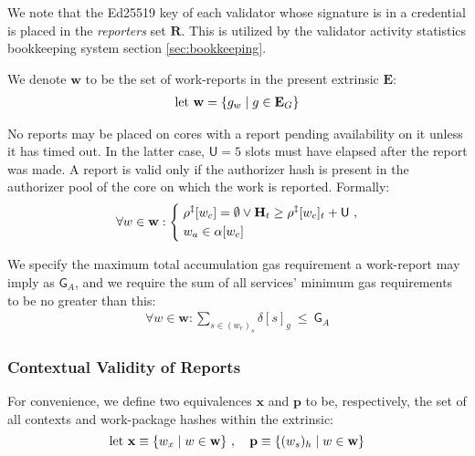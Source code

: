 We note that the Ed25519 key of each validator whose signature is in a credential is placed in the \emph{reporters} set $\mathbf{R}$. This is utilized by the validator activity statistics bookkeeping system section \ref{sec:bookkeeping}.

We denote $\mathbf{w}$ to be the set of work-reports in the present extrinsic $\mathbf{E}$:
\begin{align}
  \text{let}\ \mathbf{w} = \{ g_w \mid g \in \mathbf{E}_G \}
\end{align}

No reports may be placed on cores with a report pending availability on it unless it has timed out. In the latter case, $\mathsf{U} = 5$ slots must have elapsed after the report was made. A report is valid only if the authorizer hash is present in the authorizer pool of the core on which the work is reported. Formally:
\begin{equation}\label{eq:reportcoresareunusedortimedout}
  \forall w \in \mathbf{w} :\left\{\;\begin{aligned}
    &\rho^\ddagger[w_c] = \none \vee \mathbf{H}_t \ge \rho^\ddagger[w_c]_t + \mathsf{U}\ , \\
    &w_a \in \alpha[w_c]
  \end{aligned}\right.
\end{equation}

We specify the maximum total accumulation gas requirement a work-report may imply as $\mathsf{G}_A$, and we require the sum of all services' minimum gas requirements to be no greater than this:
\begin{align}
  \forall w \in \mathbf{w}: \sum_{s \in (w_r)_s}{\delta[s]_g}\ \le\ \mathsf{G}_A
\end{align}












\subsubsection{Contextual Validity of Reports}\label{sec:contextualvalidity}

For convenience, we define two equivalences $\mathbf{x}$ and $\mathbf{p}$ to be, respectively, the set of all contexts and work-package hashes within the extrinsic:
\begin{equation}
    \text{let } \mathbf{x} \equiv \{ w_x \mid w \in \mathbf{w} \}\ ,\quad
    \mathbf{p} \equiv \{ (w_s)_h \mid w \in \mathbf{w} \}
\end{equation}

